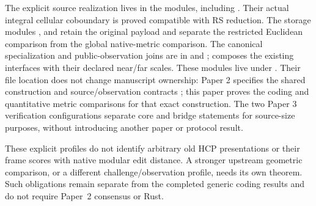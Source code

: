 The explicit source realization lives in the 
modules, including . Their actual integral cellular coboundary
is proved compatible with RS reduction. The storage modules
,  and 
retain the original payload and separate the restricted Euclidean comparison
from the global native-metric comparison. The canonical specialization and
public-observation joins are in  and
;  composes the existing
interfaces with their declared near/far scales. These modules live under
. Their file location does not change manuscript
ownership: Paper 2 specifies the shared construction and source/observation
contracts \cite{vanDerVlugt2026protocol}; this paper proves the coding and
quantitative metric comparisons for that exact construction. The two Paper 3
verification configurations separate core and bridge statements for source-size
purposes, without introducing another paper or protocol result.

These explicit profiles do not identify arbitrary old HCP presentations or
their frame scores with native modular edit distance. A stronger upstream
geometric comparison, or a different challenge/observation profile, needs its
own theorem. Such obligations remain separate from the completed generic
coding results and do not require Paper~2 consensus or Rust.
